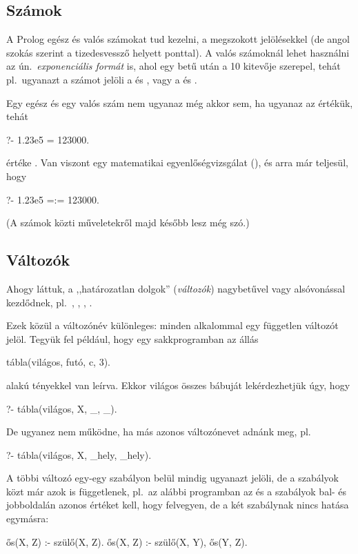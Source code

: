 \subsection*{Számok}
A Prolog egész és valós számokat tud kezelni, a
megszokott jelölésekkel (de angol szokás szerint
a tizedesvessző helyett ponttal). A valós számoknál lehet
használni az ún.~\emph{exponenciális formát} is,
ahol egy  betű után a 10 kitevője szerepel,
tehát pl.~ugyanazt a számot jelöli a  és
, vagy a  és .

Egy egész és egy valós szám nem ugyanaz még akkor
sem, ha ugyanaz az értékük, tehát
\begin{query}
?- 1.23e5 = 123000.
\end{query}
értéke . Van viszont egy matematikai
egyenlőségvizsgálat (\pr{=:=}), és arra már
teljesül, hogy
\begin{query}
?- 1.23e5 =:= 123000.
\end{query}
(A számok közti műveletekről majd később lesz még
szó.)

\subsection*{Változók}
Ahogy láttuk, a ,,határozatlan dolgok''
(\emph{változók}) nagybetűvel vagy alsóvonással
kezdődnek, pl.~, \pr{\_}, , .

Ezek közül a \pr{\_} változónév különleges: minden
alkalommal egy független változót jelöl. Tegyük fel
például, hogy egy sakkprogramban az állás
\begin{query}
tábla(világos, futó, c, 3).
\end{query}
alakú tényekkel van leírva. Ekkor világos összes
bábuját lekérdezhetjük úgy, hogy
\begin{query}
?- tábla(világos, X, _, _).
\end{query}
De ugyanez nem működne, ha más azonos változónevet
adnánk meg, pl.
\begin{query}
?- tábla(világos, X, _hely, _hely).
\end{query}

A többi változó egy-egy szabályon belül mindig
ugyanazt jelöli, de a szabályok közt már azok is
függetlenek, pl.~az alábbi programban az  és
 a szabályok bal- és jobboldalán azonos
értéket kell, hogy felvegyen, de a két szabálynak
nincs hatása egymásra:
\begin{program}
ős(X, Z) :- szülő(X, Z).
ős(X, Z) :- szülő(X, Y), ős(Y, Z).
\end{program}

